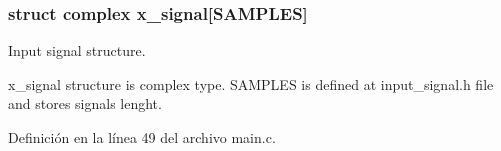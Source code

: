\subsubsection[{\texorpdfstring{x\+\_\+signal}{x_signal}}]{\setlength{\rightskip}{0pt plus 5cm}struct {\bf complex} x\+\_\+signal\mbox{[}S\+A\+M\+P\+L\+ES\mbox{]}}\hypertarget{group___main_ga50a386ea2d430e81f1bd2cbcb70eafcb}{}\label{group___main_ga50a386ea2d430e81f1bd2cbcb70eafcb}


Input signal structure. 

x\+\_\+signal structure is complex type. S\+A\+M\+P\+L\+ES is defined at input\+\_\+signal.\+h file and stores signal\textquotesingle{}s lenght. 

Definición en la línea 49 del archivo main.\+c.

